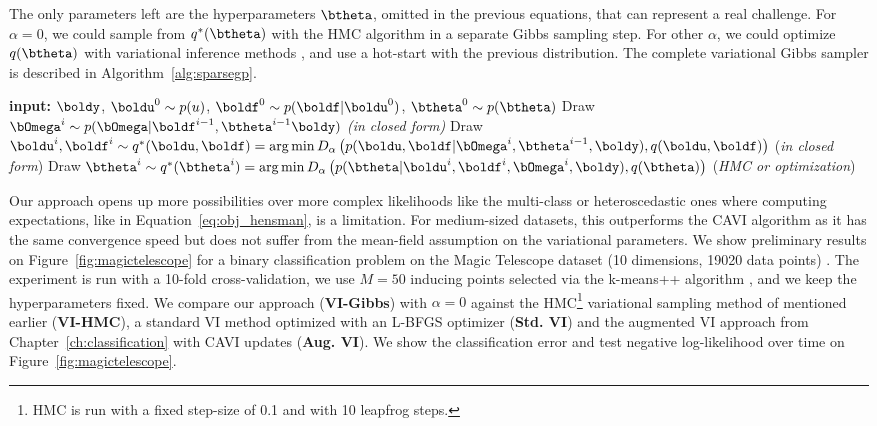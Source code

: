 The only parameters left are the hyperparameters $\btheta$, omitted in the previous equations, that can represent a real challenge.
For $\alpha=0$, we could sample from $q^*(\btheta)$ with the \ac{HMC} algorithm in a separate Gibbs sampling step.
For other $\alpha$, we could optimize $q(\btheta)$ with variational inference methods \cite{li2016renyi, hernandez2016black}, and use a hot-start with the previous distribution.
The complete variational Gibbs sampler is described in Algorithm~\ref{alg:sparsegp}.

\begin{algorithm}[H]
    \caption{Variational Gibbs Sampler for Sparse \acp{GP}}
    \begin{algorithmic}
        \State \textbf{input:} $\boldy$, $\boldu^0 \sim p(u)$, $\boldf^0 \sim p(\boldf|\boldu^0)$, $\btheta^0 \sim p(\btheta)$
        \State Draw $\bOmega^i \sim p(\bOmega|\boldf^{i-1},\btheta^{i-1}\boldy)$ \textit{(in closed form)}
        \State Draw $\boldu^i,\boldf^i \sim q^*(\boldu,\boldf) = \arg \min D_\alpha\left(p(\boldu,\boldf|\bOmega^i,\btheta^{i-1},\boldy),q(\boldu,\boldf)\right)$ (\textit{in closed form})
        \State Draw $\btheta^i \sim q^*(\btheta^i) = \arg \min D_\alpha\left(p(\btheta|\boldu^i, \boldf^i, \bOmega^i, \boldy), q(\btheta)\right)$ (\textit{\ac{HMC} or optimization})
    \EndFor
    \end{algorithmic}
    \label{alg:sparsegp}
\end{algorithm}


Our approach opens up more possibilities over more complex likelihoods like the multi-class or heteroscedastic ones where computing expectations, like in Equation~\eqref{eq:obj_hensman}, is a limitation.
For medium-sized datasets, this outperforms the \ac{CAVI} algorithm as it has the same convergence speed but does not suffer from the mean-field assumption on the variational parameters.
We show preliminary results on Figure~\ref{fig:magictelescope} for a binary classification problem on the Magic Telescope dataset (10 dimensions, 19020 data points) \cite{bock2004methods}.
The experiment is run with a 10-fold cross-validation, we use $M=50$ inducing points selected via the k-means++ algorithm \cite{arthur2007k}, and we keep the hyperparameters fixed.
We compare our approach (\textbf{VI-Gibbs}) with $\alpha=0$ against the \ac{HMC}\footnote{HMC is run with a fixed step-size of 0.1 and with 10 leapfrog steps.} variational sampling method of \citet{hensmanMCMCVariationallySparse2015} mentioned earlier (\textbf{VI-HMC}), a standard \ac{VI} method optimized with an L-BFGS optimizer (\textbf{Std. VI}) and the augmented \ac{VI} approach from Chapter~\ref{ch:classification} with \ac{CAVI} updates (\textbf{Aug. VI}).
We show the classification error and test negative log-likelihood over time on Figure~\ref{fig:magictelescope}.


